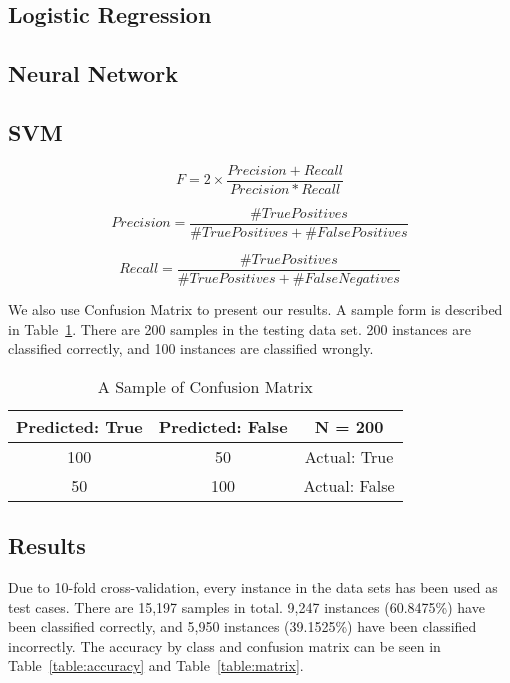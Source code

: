 \subsection{Logistic Regression}
\subsection{Neural Network}
\subsection{SVM}

\begin{equation}
F=2\times\frac{Precision+Recall}{Precision*Recall}
\end{equation}

\begin{equation}
Precision = \frac{\#TruePositives}{\#TruePositives+\#FalsePositives}
\end{equation}

\begin{equation}
Recall = \frac{\#TruePositives}{\#TruePositives+\#FalseNegatives}
\end{equation}

We also use Confusion Matrix to present our results.
A sample form is described in Table~\ref{table:sample}.
There are 200 samples in the testing data set.
200 instances are classified correctly, and 100 instances are classified wrongly.

\begin{table}
\begin{center}
\begin{tabular}{|c|c|c|}
\hline
Predicted: True & Predicted: False & N = 200 \\ \hline
100 & 50 & Actual: True \\ \hline
50 & 100 & Actual: False \\ \hline
\end{tabular}
\caption{A Sample of Confusion Matrix}
\label{table:sample}
\end{center}
\end{table}

\subsection{Results}
Due to 10-fold cross-validation, every instance in the data sets has been used as test cases.
There are 15,197 samples in total.
9,247 instances (60.8475\%) have been classified correctly, and 5,950 instances (39.1525\%) have been classified incorrectly.
The accuracy by class and confusion matrix can be seen in Table~\ref{table:accuracy} and Table~\ref{table:matrix}.


